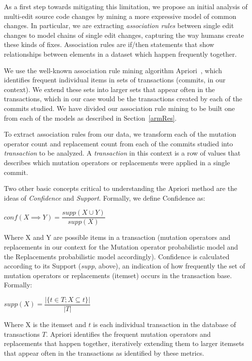 \documentclass[conference]{IEEEtran}
\begin{document}
As a first step towards mitigating this limitation, we propose 
an initial analysis of multi-edit 
source code changes by mining a more expressive model of common changes. In
particular, we are extracting \emph{association rules} between single edit changes 
to model chains of single edit changes, capturing the way humans create these kinds of fixes.
Association rules are if/then statements that show relationships between elements in a dataset which happen frequently together.

We use the 
well-known association rule mining algorithm
Apriori~\cite{Agrawal94,Liu98,Zaki2000}, which identifies frequent 
individual items in sets of transactions (commits, in our context).  We extend these sets into 
larger sets that appear often in the transactions, which in our case would be the transactions created 
by each of the commits studied. We have divided our association rule mining to
be built one from each of the models as described in Section~\ref{armRes}. 

To extract association rules from  our data, we
transform each of the mutation operator count and replacement count from 
each of the commits studied into \emph{transaction} to be analyzed. A \emph{transaction} 
in this context is a row of values that describes which mutation operators or replacements were applied in a single commit.

Two other basic concepts critical to understanding the Apriori method are the
ideas of \emph{Confidence} and \emph{Support}.
Formally, we define Confidence as:

\begin{center}
$conf(X \implies Y) = \dfrac{supp(X \cup Y)}{supp(X)}$ 
\end{center}

Where X and Y are possible items in a transaction (mutation operators and replacements in our
context for the Mutation operator probabilistic model and the Replacements probabilistic model accordingly). Confidence is calculated according to its Support (\emph{supp}, above), 
an indication of how frequently the set of mutation operators or replacements (itemset) 
 occurs in the transaction base.
Formally:

\begin{center}
$supp(X) = \dfrac{|\{t \in T; X \subseteq t\}|}{|T|}$
\end{center}

Where X is the itemset and $t$ is each individual transaction in
the database of transactions $T$. Apriori identifies the frequent mutation
operators and replacements that happen together, iteratively extending them to larger
itemsets that appear often in the transactions as identified by these metrics.
\end{document}
